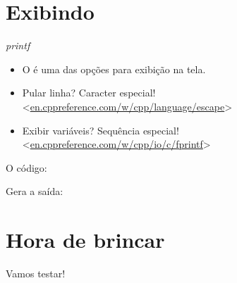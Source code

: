 \documentclass[11pt]{beamer}
\begin{document}
\section{Exibindo}
	\begin{frame}{\textit{printf}}
		\only<1>
		{
			\begin{itemize}
				\presentationPause\item O  é uma das opções para exibição na tela.
				\presentationPause\item Pular linha? Caracter especial! <\href{http://en.cppreference.com/w/cpp/language/escape}{en.cppreference.com/w/cpp/language/escape}>
				\presentationPause\item Exibir variáveis? Sequência especial! <\href{http://en.cppreference.com/w/cpp/io/c/fprintf}{en.cppreference.com/w/cpp/io/c/fprintf}>
			\end{itemize}
			\presentationPause
		}
		{
			\presentationPause
			O código:
			

			\presentationPause
			Gera a saída:
			
		}
	\end{frame}

\section{Hora de brincar}
	\begin{frame}
		\begin{center}\Huge
			Vamos testar!
		\end{center}
	\end{frame}
\end{document}
